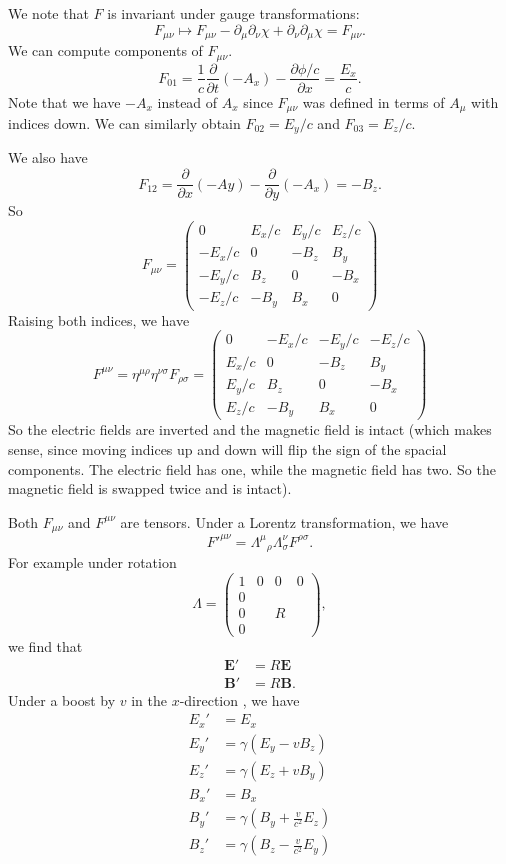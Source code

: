 \documentclass[a4paper]{article}
\begin{document}
We note that $F$ is invariant under gauge transformations:
\[
  F_{\mu\nu} \mapsto F_{\mu\nu} - \partial_\mu\partial_\nu\chi + \partial_\nu\partial_\mu \chi = F_{\mu\nu}.
\]
We can compute components of $F_{\mu\nu}$.
\[
  F_{01} = \frac{1}{c}\frac{\partial}{\partial t}(-A_x) - \frac{\partial \phi/c}{\partial x} = \frac{E_x}{c}.
\]
Note that we have $-A_x$ instead of $A_x$ since $F_{\mu\nu}$ was defined in terms of $A_\mu$ with indices down. We can similarly obtain $F_{02} = E_y/c$ and $F_{03} = E_z/c$.

We also have
\[
  F_{12} = \frac{\partial}{\partial x}(-Ay) - \frac{\partial}{\partial y}(-A_x) = -B_z.
\]
So
\[
  F_{\mu\nu} =
  \begin{pmatrix}
    0 & E_x/c & E_y/c & E_z/c\\
    -E_x/c & 0 & -B_z & B_y\\
    -E_y/c & B_z & 0 & -B_x\\
    -E_z/c & -B_y & B_x & 0
  \end{pmatrix}
\]
Raising both indices, we have
\[
  F^{\mu\nu} = \eta^{\mu\rho}\eta^{\nu\sigma} F_{\rho\sigma} =
  \begin{pmatrix}
    0 & -E_x/c & -E_y/c & -E_z/c\\
    E_x/c & 0 & -B_z & B_y\\
    E_y/c & B_z & 0 & -B_x\\
    E_z/c & -B_y & B_x & 0
  \end{pmatrix}
\]
So the electric fields are inverted and the magnetic field is intact (which makes sense, since moving indices up and down will flip the sign of the spacial components. The electric field has one, while the magnetic field has two. So the magnetic field is swapped twice and is intact).

Both $F_{\mu\nu}$ and $F^{\mu\nu}$ are tensors. Under a Lorentz transformation, we have
\[
  F'^{\mu\nu} = \Lambda^\mu\!_\rho\Lambda^\nu_\sigma F^{\rho\sigma}.
\]
For example under rotation
\[
  \Lambda =
  \begin{pmatrix}
    1 & 0 & 0 & 0\\
    0\\
    0 & & R\\
    0
  \end{pmatrix},
\]
we find that
\begin{align*}
  \mathbf{E}' &= R\mathbf{E}\\
  \mathbf{B}' &= R\mathbf{B}.
\end{align*}
Under a boost by $v$ in the $x$-direction , we have
\begin{align*}
  E_x' &= E_x\\
  E_y' &= \gamma(E_y - vB_z)\\
  E_z' &= \gamma(E_z + vB_y)\\
  B_x' &= B_x\\
  B_y' &= \gamma\left(B_y + \frac{v}{c^2}E_z\right)\\
  B_z' &= \gamma\left(B_z - \frac{v}{c^2} E_y\right)
\end{align*}
\end{document}
